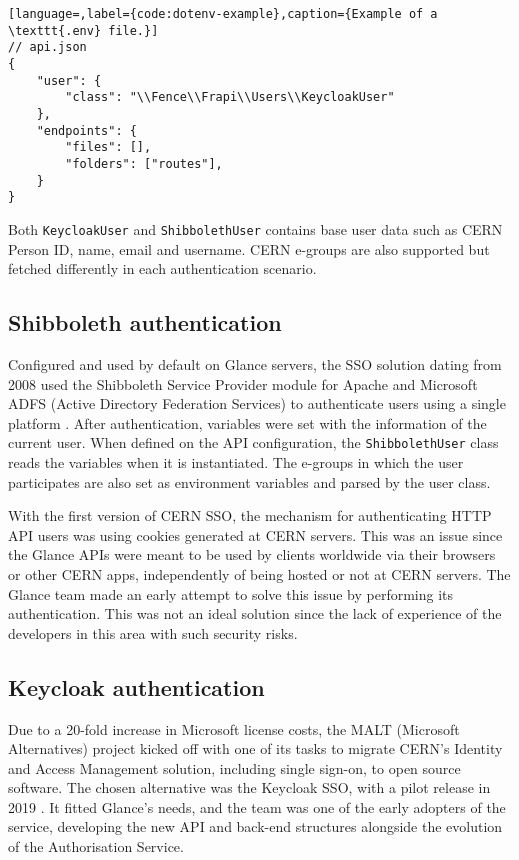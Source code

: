 \begin{lstlisting}[language=,label={code:dotenv-example},caption={Example of a \texttt{.env} file.}]
// api.json
{
    "user": {
        "class": "\\Fence\\Frapi\\Users\\KeycloakUser"
    },
    "endpoints": {
        "files": [],
        "folders": ["routes"],
    }
}
\end{lstlisting}

Both \texttt{KeycloakUser} and \texttt{ShibbolethUser} contains base user data such as CERN Person ID, name, email and username. CERN e-groups are also supported but fetched differently in each authentication scenario.

\subsection{Shibboleth authentication}

Configured and used by default on Glance servers, the SSO solution dating from 2008 used the Shibboleth Service Provider module for Apache and Microsoft ADFS (Active Directory Federation Services) to authenticate users using a single platform \cite{shibboleth-article}. After authentication, variables were set with the information of the current user. When defined on the API configuration, the \texttt{ShibbolethUser} class reads the variables when it is instantiated. The e-groups in which the user participates are also set as environment variables and parsed by the user class.

With the first version of CERN SSO, the mechanism for authenticating HTTP API users was using cookies generated at CERN servers. This was an issue since the Glance APIs were meant to be used by clients worldwide via their browsers or other CERN apps, independently of being hosted or not at CERN servers. The Glance team made an early attempt to solve this issue by performing its authentication. This was not an ideal solution since the lack of experience of the developers in this area with such security risks.

\subsection{Keycloak authentication}

Due to a 20-fold increase in Microsoft license costs, the MALT (Microsoft Alternatives) \cite{malt} \cite{malt-internal} \cite{malt-auth} project kicked off with one of its tasks to migrate CERN's Identity and Access Management solution, including single sign-on, to open source software. The chosen alternative was the Keycloak SSO, with a pilot release in 2019 \cite{keycloak-article}. It fitted Glance's needs, and the team was one of the early adopters of the service, developing the new API and back-end structures alongside the evolution of the Authorisation Service.

